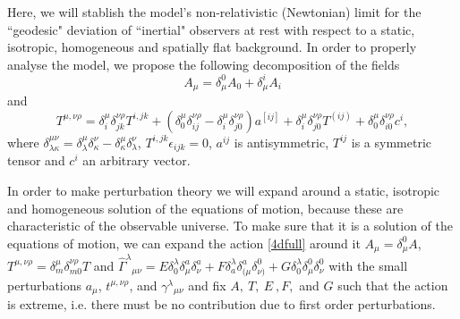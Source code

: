 \documentclass[twocolumn,
  showpacs,showkeys,prd,superscriptaddress]{revtex4-1}
\begin{document}
Here, we will stablish the model's non-relativistic (Newtonian) limit for the ``geodesic" deviation of ``inertial" observers at rest with respect to a static, isotropic, homogeneous and spatially flat background. In order to properly analyse the model, we  propose the following decomposition of the fields
\begin{dmath}
  A_\mu = \delta_\mu^0 A_0 + \delta_\mu^i A_i 
\end{dmath}
and
\begin{dmath}
  T^{\mu,\nu\rho} = \delta^{\mu}_i\delta^{\nu\rho}_{jk}T^{i,jk} + (\delta^{\mu}_0\delta^{\nu\rho}_{ij}-\delta^{\mu}_i\delta^{\nu\rho}_{j0})a^{[ij]} + \delta^{\mu}_i\delta^{\nu\rho}_{j0}T^{(ij)} + \delta^{\mu}_0\delta^{\nu\rho}_{i0}c^i,
\end{dmath}
where $\delta^{\mu\nu}_{\lambda\kappa}=\delta^{\mu}_{\lambda}\delta^{\nu}_{\kappa}-\delta^{\mu}_{\kappa}\delta^{\nu}_{\lambda}$, $T^{i,jk}\epsilon_{ijk}=0$, $a^{ij}$ is antisymmetric, $T^{ij}$ is a symmetric tensor and $c^i$ an arbitrary vector.

In order to make perturbation theory we will expand around a static, isotropic and homogeneous solution of the equations of motion, because these are characteristic of the observable universe. To make sure that it is a solution of the equations of motion, we can expand the action \eqref{4dfull} around it $A_\mu=\delta_\mu^0 A$, $T^{\mu,\nu\rho}=\delta^{\mu}_m\delta^{\nu\rho}_{m0}T$ and $\hat\Gamma^\lambda{}_{\mu\nu}=E\delta^\lambda_0\delta^a_\mu\delta^a_\nu +F\delta^\lambda_a \delta^a_{(\mu}\delta^0_{\nu)}+G\delta^\lambda_0 \delta^0_{\mu}\delta^0_{\nu}$ with the small perturbations $a_\mu$, $t^{\mu,\nu\rho}$, and $\gamma^\lambda{}_{\mu\nu}$ and fix $A,\ T,\ E\ ,F,$ and $G$ such that the action is extreme, i.e. there must be no contribution due to first order perturbations.
\end{document}
